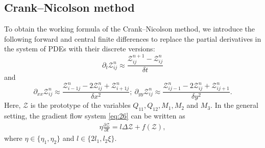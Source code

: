 \documentclass{article}
\begin{document}
\subsection{Crank--Nicolson method}
To obtain the working formula of the Crank--Nicolson method, we introduce the following forward and central finite differences \cite{Burden-Faires, smith1985numerical} to replace the partial derivatives in the system of PDEs with their discrete versions:
$$\partial_t \mathcal{Z}^n_{ij} \approx \frac{\mathcal{Z}^{n+1}_{ij} - \mathcal{Z}^{n}_{ij}}{\delta t}$$
and
$$\partial_{xx} \mathcal{Z}^n_{ij} \approx \frac{\mathcal{Z}^{n}_{i-1j} - 2\mathcal{Z}^{n}_{ij} + \mathcal{Z}^{n}_{i+1j}}{\delta x^2};~\partial_{yy} \mathcal{Z}^n_{ij} \approx \frac{\mathcal{Z}^{n}_{ij-1} - 2 \mathcal{Z}^{n}_{ij} + \mathcal{Z}^{n}_{ij+1}}{\delta y^2}.$$
Here, $\mathcal{Z}$ is the prototype of the variables $Q_{11}, Q_{12}, M_1, M_2$ and $M_3$. In the general setting, the gradient flow system \eqref{eq:26} can be written as
\begin{eqnarray}
\eta\frac{\partial \mathcal{Z}}{\partial t}=l\Delta\mathcal{Z} + f\left(\mathcal{Z}\right),\label{CN}
\end{eqnarray}
where $\eta\in\{\eta_1,\eta_2\}$ and $l\in\{2l_1,l_2\xi\}$. 
\end{document}
